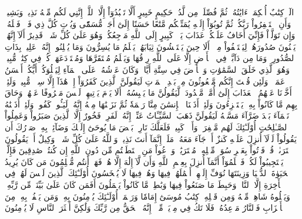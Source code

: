 الٓرۚ كِتَٰبٌ أُحۡكِمَتۡ ءَايَٰتُهُۥ ثُمَّ فُصِّلَتۡ مِن لَّدُنۡ حَكِيمٍ خَبِيرٍ
أَلَّا تَعۡبُدُوٓاْ إِلَّا ٱللَّهَۚ إِنَّنِي لَكُم مِّنۡهُ نَذِيرٞ وَبَشِيرٞ
وَأَنِ ٱسۡتَغۡفِرُواْ رَبَّكُمۡ ثُمَّ تُوبُوٓاْ إِلَيۡهِ يُمَتِّعۡكُم مَّتَٰعًا حَسَنًا إِلَىٰٓ أَجَلٖ مُّسَمّٗى وَيُؤۡتِ كُلَّ ذِي فَضۡلٖ فَضۡلَهُۥۖ وَإِن تَوَلَّوۡاْ فَإِنِّيٓ أَخَافُ عَلَيۡكُمۡ عَذَابَ يَوۡمٖ كَبِيرٍ
إِلَى ٱللَّهِ مَرۡجِعُكُمۡۖ وَهُوَ عَلَىٰ كُلِّ شَيۡءٖ قَدِيرٌ
أَلَآ إِنَّهُمۡ يَثۡنُونَ صُدُورَهُمۡ لِيَسۡتَخۡفُواْ مِنۡهُۚ أَلَا حِينَ يَسۡتَغۡشُونَ ثِيَابَهُمۡ يَعۡلَمُ مَا يُسِرُّونَ وَمَا يُعۡلِنُونَۚ إِنَّهُۥ عَلِيمُۢ بِذَاتِ ٱلصُّدُورِ
۞وَمَا مِن دَآبَّةٖ فِي ٱلۡأَرۡضِ إِلَّا عَلَى ٱللَّهِ رِزۡقُهَا وَيَعۡلَمُ مُسۡتَقَرَّهَا وَمُسۡتَوۡدَعَهَاۚ كُلّٞ فِي كِتَٰبٖ مُّبِينٖ
وَهُوَ ٱلَّذِي خَلَقَ ٱلسَّمَٰوَٰتِ وَٱلۡأَرۡضَ فِي سِتَّةِ أَيَّامٖ وَكَانَ عَرۡشُهُۥ عَلَى ٱلۡمَآءِ لِيَبۡلُوَكُمۡ أَيُّكُمۡ أَحۡسَنُ عَمَلٗاۗ وَلَئِن قُلۡتَ إِنَّكُم مَّبۡعُوثُونَ مِنۢ بَعۡدِ ٱلۡمَوۡتِ لَيَقُولَنَّ ٱلَّذِينَ كَفَرُوٓاْ إِنۡ هَٰذَآ إِلَّا سِحۡرٞ مُّبِينٞ
وَلَئِنۡ أَخَّرۡنَا عَنۡهُمُ ٱلۡعَذَابَ إِلَىٰٓ أُمَّةٖ مَّعۡدُودَةٖ لَّيَقُولُنَّ مَا يَحۡبِسُهُۥٓۗ أَلَا يَوۡمَ يَأۡتِيهِمۡ لَيۡسَ مَصۡرُوفًا عَنۡهُمۡ وَحَاقَ بِهِم مَّا كَانُواْ بِهِۦ يَسۡتَهۡزِءُونَ
وَلَئِنۡ أَذَقۡنَا ٱلۡإِنسَٰنَ مِنَّا رَحۡمَةٗ ثُمَّ نَزَعۡنَٰهَا مِنۡهُ إِنَّهُۥ لَيَـُٔوسٞ كَفُورٞ
وَلَئِنۡ أَذَقۡنَٰهُ نَعۡمَآءَ بَعۡدَ ضَرَّآءَ مَسَّتۡهُ لَيَقُولَنَّ ذَهَبَ ٱلسَّيِّـَٔاتُ عَنِّيٓۚ إِنَّهُۥ لَفَرِحٞ فَخُورٌ
إِلَّا ٱلَّذِينَ صَبَرُواْ وَعَمِلُواْ ٱلصَّـٰلِحَٰتِ أُوْلَـٰٓئِكَ لَهُم مَّغۡفِرَةٞ وَأَجۡرٞ كَبِيرٞ
فَلَعَلَّكَ تَارِكُۢ بَعۡضَ مَا يُوحَىٰٓ إِلَيۡكَ وَضَآئِقُۢ بِهِۦ صَدۡرُكَ أَن يَقُولُواْ لَوۡلَآ أُنزِلَ عَلَيۡهِ كَنزٌ أَوۡ جَآءَ مَعَهُۥ مَلَكٌۚ إِنَّمَآ أَنتَ نَذِيرٞۚ وَٱللَّهُ عَلَىٰ كُلِّ شَيۡءٖ وَكِيلٌ
أَمۡ يَقُولُونَ ٱفۡتَرَىٰهُۖ قُلۡ فَأۡتُواْ بِعَشۡرِ سُوَرٖ مِّثۡلِهِۦ مُفۡتَرَيَٰتٖ وَٱدۡعُواْ مَنِ ٱسۡتَطَعۡتُم مِّن دُونِ ٱللَّهِ إِن كُنتُمۡ صَٰدِقِينَ
فَإِلَّمۡ يَسۡتَجِيبُواْ لَكُمۡ فَٱعۡلَمُوٓاْ أَنَّمَآ أُنزِلَ بِعِلۡمِ ٱللَّهِ وَأَن لَّآ إِلَٰهَ إِلَّا هُوَۖ فَهَلۡ أَنتُم مُّسۡلِمُونَ
مَن كَانَ يُرِيدُ ٱلۡحَيَوٰةَ ٱلدُّنۡيَا وَزِينَتَهَا نُوَفِّ إِلَيۡهِمۡ أَعۡمَٰلَهُمۡ فِيهَا وَهُمۡ فِيهَا لَا يُبۡخَسُونَ
أُوْلَـٰٓئِكَ ٱلَّذِينَ لَيۡسَ لَهُمۡ فِي ٱلۡأٓخِرَةِ إِلَّا ٱلنَّارُۖ وَحَبِطَ مَا صَنَعُواْ فِيهَا وَبَٰطِلٞ مَّا كَانُواْ يَعۡمَلُونَ
أَفَمَن كَانَ عَلَىٰ بَيِّنَةٖ مِّن رَّبِّهِۦ وَيَتۡلُوهُ شَاهِدٞ مِّنۡهُ وَمِن قَبۡلِهِۦ كِتَٰبُ مُوسَىٰٓ إِمَامٗا وَرَحۡمَةًۚ أُوْلَـٰٓئِكَ يُؤۡمِنُونَ بِهِۦۚ وَمَن يَكۡفُرۡ بِهِۦ مِنَ ٱلۡأَحۡزَابِ فَٱلنَّارُ مَوۡعِدُهُۥۚ فَلَا تَكُ فِي مِرۡيَةٖ مِّنۡهُۚ إِنَّهُ ٱلۡحَقُّ مِن رَّبِّكَ وَلَٰكِنَّ أَكۡثَرَ ٱلنَّاسِ لَا يُؤۡمِنُونَ
